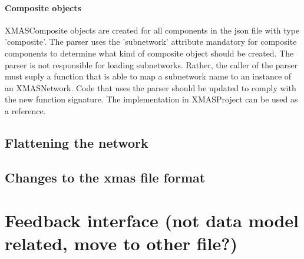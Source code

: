 \paragraph{Composite objects}
XMASComposite objects are created for all components in the json file with type
'composite'. The parser uses the 'subnetwork' attribute mandatory for composite
components to determine what kind of composite object should be created. The
parser is not responsible for loading subnetworks. Rather, the caller of the parser
must suply a function that is able to map a subnetwork name to an instance of
an XMASNetwork. Code that uses the parser should be updated to comply with the
new function signature. The implementation in XMASProject can be used as a reference.




\subsection{Flattening the network}

\subsection{Changes to the xmas file format}

\section{Feedback interface (not data model related, move to other file?)}

\newpage

